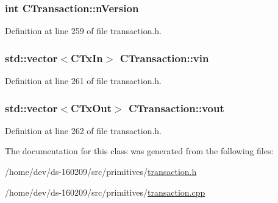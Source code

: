 \hypertarget{class_c_transaction_a6c29bdd822859c7b21b7b6c22dca6825}{}
\subsubsection[{n\+Version}]{\setlength{\rightskip}{0pt plus 5cm}int C\+Transaction\+::n\+Version}\label{class_c_transaction_a6c29bdd822859c7b21b7b6c22dca6825}


Definition at line 259 of file transaction.\+h.

\hypertarget{class_c_transaction_a53fa787e4ea57374b4fa2a28e9a957b2}{}
\subsubsection[{vin}]{\setlength{\rightskip}{0pt plus 5cm}std\+::vector$<${\bf C\+Tx\+In}$>$ C\+Transaction\+::vin}\label{class_c_transaction_a53fa787e4ea57374b4fa2a28e9a957b2}


Definition at line 261 of file transaction.\+h.

\hypertarget{class_c_transaction_ae42c0032a464c3054c508017c7d040ef}{}
\subsubsection[{vout}]{\setlength{\rightskip}{0pt plus 5cm}std\+::vector$<${\bf C\+Tx\+Out}$>$ C\+Transaction\+::vout}\label{class_c_transaction_ae42c0032a464c3054c508017c7d040ef}


Definition at line 262 of file transaction.\+h.



The documentation for this class was generated from the following files\+:\begin{DoxyCompactItemize}
\item 
/home/dev/ds-\/160209/src/primitives/\hyperlink{transaction_8h}{transaction.\+h}\item 
/home/dev/ds-\/160209/src/primitives/\hyperlink{transaction_8cpp}{transaction.\+cpp}\end{DoxyCompactItemize}
